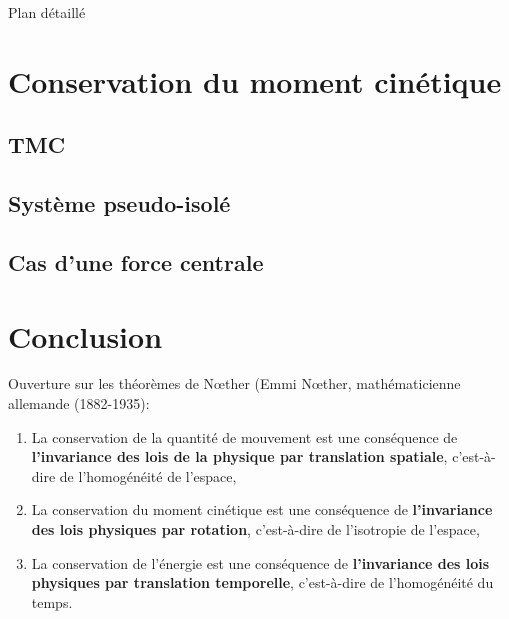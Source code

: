 \begin{reportBlock}{Plan détaillé}
\section{Conservation du moment cinétique}

\subsection{TMC}
\subsection{Système pseudo-isolé}
\subsection{Cas d'une force centrale}


\section*{Conclusion}
Ouverture sur les théorèmes de N\oe ther (Emmi N\oe ther, mathématicienne allemande (1882-1935):
\begin{enumerate}
    \item La conservation de la quantité de mouvement est une conséquence de \textbf{l'invariance des lois de la physique par translation spatiale}, c'est-à-dire de l'homogénéité de l'espace,
    \item  La conservation du moment cinétique est une conséquence de \textbf{l'invariance des lois physiques par rotation}, c'est-à-dire de l'isotropie de l'espace,
    \item La conservation de l'énergie est une conséquence de \textbf{l'invariance des lois physiques par translation temporelle}, c'est-à-dire de l'homogénéité du temps.
\end{enumerate}

\end{reportBlock}